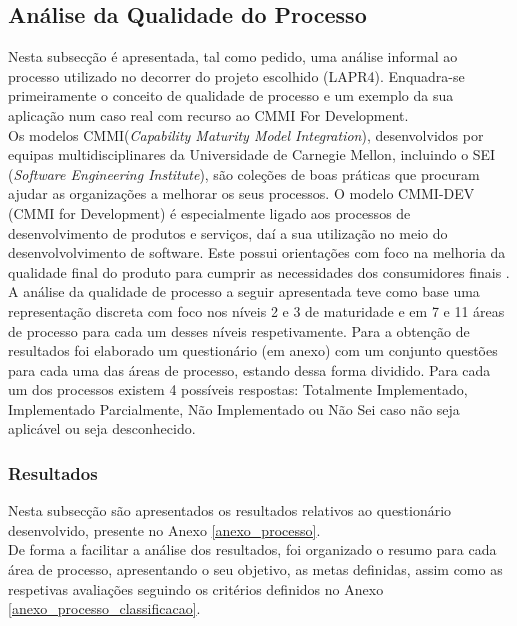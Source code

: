 \documentclass[openany,10pt,a4paper]{article}
\begin{document}
\subsection{Análise da Qualidade do Processo}
Nesta subsecção é apresentada, tal como pedido, uma análise informal ao processo utilizado no decorrer do projeto escolhido (LAPR4). Enquadra-se primeiramente o conceito de qualidade de processo e um exemplo da sua aplicação num caso real com recurso ao CMMI For Development. \\
Os modelos CMMI(\textit{Capability Maturity Model Integration}), desenvolvidos por equipas multidisciplinares da Universidade de Carnegie Mellon, incluindo o SEI (\textit{Software Engineering Institute}), são coleções de boas práticas que procuram ajudar as organizações a melhorar os seus processos. O modelo CMMI-DEV (CMMI for Development) é especialmente ligado aos processos de desenvolvimento de produtos e serviços, daí a sua utilização no meio do desenvolvolvimento de software. Este possui orientações com foco na melhoria da qualidade final do produto para cumprir as necessidades dos consumidores finais \cite{CMMIProductTeam2010}.\\ 
A análise da qualidade de processo a seguir apresentada teve como base uma representação discreta com foco nos níveis 2 e 3 de maturidade e em 7 e 11 áreas de processo para cada um desses níveis respetivamente. Para a obtenção de resultados foi elaborado um questionário (em anexo) com um conjunto questões para cada uma das áreas de processo, estando dessa forma dividido. Para cada um dos processos existem 4 possíveis respostas: Totalmente Implementado, Implementado Parcialmente, Não Implementado ou Não Sei caso não seja aplicável ou seja desconhecido.

\subsubsection{Resultados}
Nesta subsecção são apresentados os resultados relativos ao questionário desenvolvido, presente no Anexo \ref{anexo_processo}. \\
De forma a facilitar a análise dos resultados, foi organizado o resumo para cada área de processo, apresentando o seu objetivo, as metas definidas, assim como as respetivas avaliações seguindo os critérios definidos no Anexo \ref{anexo_processo_classificacao}.
\end{document}
